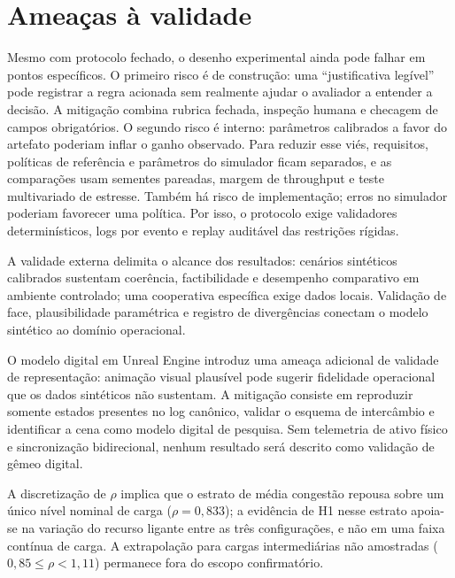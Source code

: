 \documentclass[
  12pt,
  oneside,
  a4paper,
  sumario=tradicional,
  brazil
]{abntex2}
\begin{document}
\chapter{Ameaças à validade}
Mesmo com protocolo fechado, o desenho experimental ainda pode falhar em pontos espec\'ificos. O primeiro risco \'e de constru\c{c}\~ao: uma ``justificativa leg\'ivel'' pode registrar a regra acionada sem realmente ajudar o avaliador a entender a decis\~ao. A mitiga\c{c}\~ao combina rubrica fechada, inspe\c{c}\~ao humana e checagem de campos obrigat\'orios. O segundo risco \'e interno: par\^ametros calibrados a favor do artefato poderiam inflar o ganho observado. Para reduzir esse vi\'es, requisitos, pol\'iticas de refer\^encia e par\^ametros do simulador ficam separados, e as compara\c{c}\~oes usam sementes pareadas, margem de throughput e teste multivariado de estresse. Tamb\'em h\'a risco de implementa\c{c}\~ao; erros no simulador poderiam favorecer uma pol\'itica. Por isso, o protocolo exige validadores determin\'isticos, logs por evento e replay audit\'avel das restri\c{c}\~oes r\'igidas.

A validade externa delimita o alcance dos resultados: cen\'arios sint\'eticos calibrados sustentam coer\^encia, factibilidade e desempenho comparativo em ambiente controlado; uma cooperativa espec\'ifica exige dados locais. Valida\c{c}\~ao de face, plausibilidade param\'etrica e registro de diverg\^encias conectam o modelo sint\'etico ao dom\'inio operacional.

O modelo digital em Unreal Engine introduz uma amea\c{c}a adicional de validade de
representa\c{c}\~ao: anima\c{c}\~ao visual plaus\'ivel pode sugerir fidelidade operacional que
os dados sint\'eticos n\~ao sustentam. A mitiga\c{c}\~ao consiste em reproduzir somente
estados presentes no log can\^onico, validar o esquema de interc\^ambio e identificar a cena
como modelo digital de pesquisa. Sem telemetria de ativo f\'isico e sincroniza\c{c}\~ao
bidirecional, nenhum resultado ser\'a descrito como valida\c{c}\~ao de g\^emeo digital.

A discretiza\c{c}\~ao de $\rho$ implica que o estrato de m\'edia congest\~ao repousa sobre um \'unico n\'ivel nominal de carga ($\rho=0{,}833$); a evid\^encia de H1 nesse estrato apoia-se na varia\c{c}\~ao do recurso ligante entre as tr\^es configura\c{c}\~oes, e n\~ao em uma faixa cont\'inua de carga. A extrapola\c{c}\~ao para cargas intermedi\'arias n\~ao amostradas ($0{,}85 \leq \rho < 1{,}11$) permanece fora do escopo confirmat\'orio.
\end{document}
